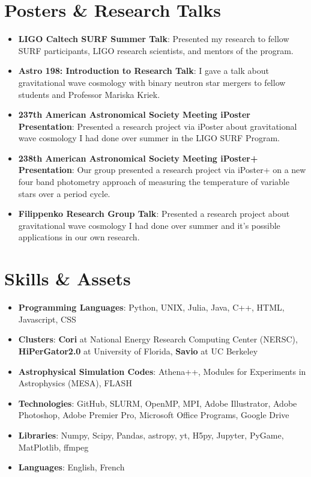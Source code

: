 \documentclass[letterpaper,10pt]{article}
\newcommand{\resumeSubHeadingListStart}{\begin{itemize}[leftmargin=*]}
\newcommand{\resumeSubHeadingListEnd}{\end{itemize}}
\newcommand{\shorterSection}[1]{\vspace{-10pt}\section{#1}}
\begin{document}
\shorterSection{Posters \& Research Talks}
  \resumeSubHeadingListStart
  \small
    \item{
     \textbf{LIGO Caltech SURF Summer Talk}{: Presented my research to fellow SURF participants, LIGO research scientists, and mentors of the program.}
    }
    \vspace{-5pt}
    \item{
     \textbf{Astro 198: Introduction to Research Talk}{: I gave a talk about gravitational wave cosmology with binary neutron star mergers to fellow students and Professor Mariska Kriek.}
    }
    \vspace{-5pt}
    \item{
     \textbf{237th American Astronomical Society Meeting iPoster Presentation}{: Presented a research project via iPoster about gravitational wave cosmology I had done over summer in the LIGO SURF Program.}
    }
    \vspace{-5pt}
    \item{
     \textbf{238th American Astronomical Society Meeting iPoster+ Presentation}{: Our group presented a research project via iPoster+ on a new four band photometry approach of measuring the temperature of variable stars over a period cycle.}
    }
    \vspace{-5pt}
    \item{
     \textbf{Filippenko Research Group Talk}{: Presented a research project about gravitational wave cosmology I had done over summer and it's possible applications in our own research.}
    }
    
\resumeSubHeadingListEnd

\shorterSection{Skills \& Assets}
  \resumeSubHeadingListStart
  \small
    \item{
     \textbf{Programming Languages}{: Python, UNIX, Julia, Java, C++, HTML, Javascript, CSS}
    }
    \vspace{-5pt}
    \item{
     \textbf{Clusters}{: \textbf{Cori} at National Energy Research Computing Center (NERSC), \textbf{HiPerGator2.0} at University of Florida, \textbf{Savio} at UC Berkeley}
    }
    \vspace{-5pt}
    \item{
     \textbf{Astrophysical Simulation Codes}{: Athena++, Modules for Experiments in Astrophysics (MESA), FLASH}
    }
    \vspace{-5pt}
    \item{
     \textbf{Technologies}{: GitHub, SLURM, OpenMP, MPI, Adobe Illustrator, Adobe Photoshop, Adobe Premier Pro, Microsoft Office Programs, Google Drive}
    }
    \vspace{-5pt}
    \item{
     \textbf{Libraries}{: Numpy, Scipy, Pandas, astropy, yt, H5py, Jupyter, PyGame, MatPlotlib, ffmpeg}
    }
    \vspace{-5pt}
    \item{
     \textbf{Languages}{: English, French}
    }
\resumeSubHeadingListEnd
\end{document}
